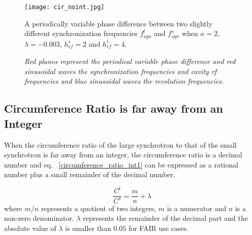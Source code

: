 \begin{figure}[!htb]
   \centering   
   \texttt{[image: cir\_noint.jpg]}
   \caption{A periodically variable phase difference between two slightly different synchronization frequencies $f_{\mathit{syn}}^{l}$ and $f_{\mathit{syn}}^{s}$ when $\kappa=2$, $\lambda=-0.003$, $h^s_\mathit{rf}=2$ and $h^l_\mathit{rf}=4$.}
	\caption*{\textsl{\small{Red planes represent the periodical variable phase difference and red sinusoidal waves the synchronization frequencies and cavity rf frequencies and blue sinusoidal waves the revolution frequencies.}}}
   \label{cir_noint}
\end{figure} 

%

\subsection{Circumference Ratio is far away from an Integer}
When the circumference ratio of the large synchrotron to that of the small synchrotron is far away from an integer, the circumference ratio is a decimal number and eq. ~\ref{circumference_ratio_int1} can be expressed as a rational number plus a small remainder of the decimal number.

\begin{equation}
\frac{C^l}{C^s}=\frac{m}{n}+ \lambda \label{circumference_ratio_noint11}
\end{equation}
where $m/n$ represents a quotient of two integers, $m$ is a numerator and $n$ is a non-zero denominator. $\lambda$ represents the remainder of the decimal part and the absolute value of $\lambda$ is smaller than $0.05$ for FAIR use cases.   


